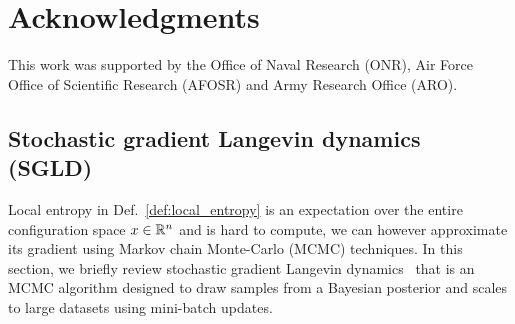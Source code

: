 \documentclass[10pt]{article}
\begin{document}
\section{Acknowledgments}
\label{s:acknowledgements}

This work was supported by the Office of Naval Research (ONR), Air Force Office of Scientific Research (AFOSR) and Army Research Office (ARO).

{
\footnotesize
\linespread{1.0}


}

\begin{appendices}

\renewcommand\thetable{\thesection\arabic{table}}
\renewcommand\thefigure{\thesection\arabic{figure}}

\section{Stochastic gradient Langevin dynamics (SGLD)}
\label{s:app:langevin}

Local entropy in Def.~\eqref{def:local_entropy} is an expectation over the entire configuration space $x \in \mathbb{R}^n$ and is hard to compute, we can however approximate its gradient using Markov chain Monte-Carlo (MCMC) techniques. In this section, we briefly review stochastic gradient Langevin dynamics~\citep{welling2011bayesian} that is an MCMC algorithm designed to draw samples from a Bayesian posterior and scales to large datasets using mini-batch updates.


\end{appendices}
\end{document}

